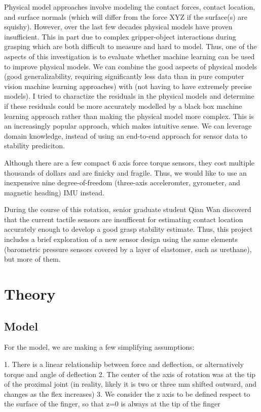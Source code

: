 \documentclass[12pt]{article}
\begin{document}
Physical model approaches involve modeling the contact forces, contact location, and surface normals
(which will differ from the force XYZ if the surface(s) are squishy).  However, over the last few
decades physical models have proven insufficient. This in part due to complex gripper-object
interactions during grasping which are both difficult to measure and hard to model. Thus, one of the
aspects of this investigation is to evaluate whether machine learning can be used to improve
physical models. We can combine the good aspects of physical models (good generalizability,
requiring significantly less data than in pure computer vision machine learning approaches) with
(not having to have extremely precise models). I tried to charactize the residuals in
the physical models and determine if these residuals could be more accurately modelled by a black
box machine learning approach rather than making the physical model more complex. This is an
increasingly popular approach, which makes intuitive sense. We can leverage
domain knowledge, instead of using an end-to-end approach for sensor data to stability prediciton.

Although there are a few compact 6 axis force torque sensors, they cost multiple thousands of
dollars and are finicky and fragile. Thus, we would like to use an inexpensive nine
degree-of-freedom (three-axis acceleromter, gyrometer, and magnetic heading) IMU instead.

During the course of this rotation, senior graduate student Qian Wan discoverd that the current tactile
sensors are insufficent for estimating contact location accurately enough to develop a good grasp
stability estimate. Thus, this project includes a brief exploration of a new sensor design using the
same elements (barometric pressure sensors covered by a layer of elastomer, such as urethane), but
more of them.

\section{Theory} \label{sec:firstpage}


\subsection{Model}

For the model, we are making a few simplifying assumptions:

1. There is a linear relationship between force and deflection, or alternatively torque and angle of
deflection
2. The center of the axis of rotation was at the tip of the proximal joint
(in reality, likely it is two or three mm shifted outward, and changes as the flex increases)
3. We consider the z axis to be defined respect to the surface of the finger, so that z=0 is always
at the tip of the finger
\end{document}
